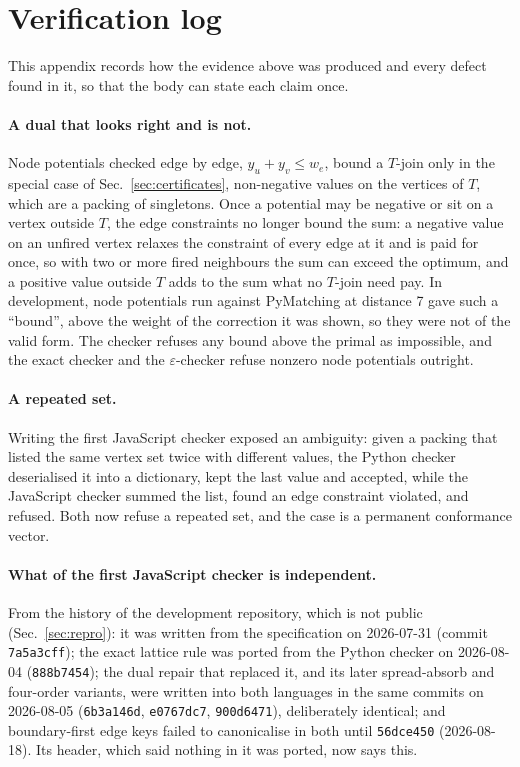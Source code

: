 \documentclass[aps,pra,twocolumn,superscriptaddress,nofootinbib,longbibliography,floatfix]{revtex4-2}
\newcommand{\eps}{\varepsilon}
\newcommand{\T}{T}
\begin{document}
\section{Verification log}
\label{app:log}

This appendix records how the evidence above was produced and every defect found in it, so that the body can state each claim once.

\paragraph*{A dual that looks right and is not.} Node potentials checked edge by edge, $y_u+y_v\le w_e$, bound a $\T$-join only in the special case of Sec.~\ref{sec:certificates}, non-negative values on the vertices of $\T$, which are a packing of singletons. Once a potential may be negative or sit on a vertex outside $\T$, the edge constraints no longer bound the sum: a negative value on an unfired vertex relaxes the constraint of every edge at it and is paid for once, so with two or more fired neighbours the sum can exceed the optimum, and a positive value outside $\T$ adds to the sum what no $\T$-join need pay. In development, node potentials run against PyMatching at distance 7 gave such a ``bound'', above the weight of the correction it was shown, so they were not of the valid form. The checker refuses any bound above the primal as impossible, and the exact checker and the $\eps$-checker refuse nonzero node potentials outright.

\paragraph*{A repeated set.} Writing the first JavaScript checker exposed an ambiguity: given a packing that listed the same vertex set twice with different values, the Python checker deserialised it into a dictionary, kept the last value and accepted, while the JavaScript checker summed the list, found an edge constraint violated, and refused. Both now refuse a repeated set, and the case is a permanent conformance vector.

\paragraph*{What of the first JavaScript checker is independent.} From the history of the development repository, which is not public (Sec.~\ref{sec:repro}): it was written from the specification on 2026-07-31 (commit \texttt{7a5a3cff}); the exact lattice rule was ported from the Python checker on 2026-08-04 (\texttt{888b7454}); the dual repair that replaced it, and its later spread-absorb and four-order variants, were written into both languages in the same commits on 2026-08-05 (\texttt{6b3a146d}, \texttt{e0767dc7}, \texttt{900d6471}), deliberately identical; and boundary-first edge keys failed to canonicalise in both until \texttt{56dce450} (2026-08-18). Its header, which said nothing in it was ported, now says this.
\end{document}

